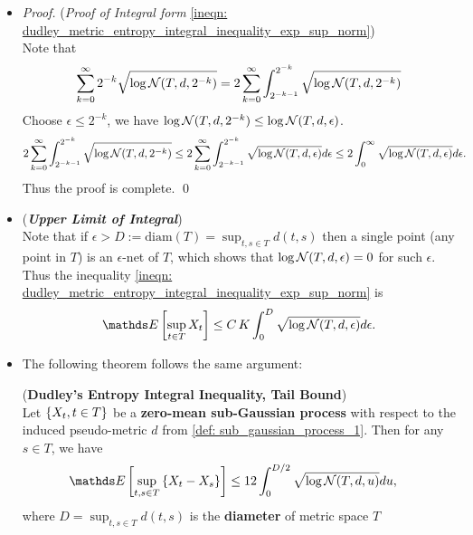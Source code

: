 \documentclass[11pt]{article}
\begin{document}
\begin{itemize}
\item \begin{proof} (\emph{Proof of Integral form} \eqref{ineqn: dudley_metric_entropy_integral_inequality_exp_sup_norm})\\
Note that 
\begin{align*}
\sum_{k=0}^{\infty} 2^{-k} \sqrt{\log {\mathcal N}(T, d, 2^{-k}) } = 2\sum_{k=0}^{\infty} \int_{2^{-k-1}}^{2^{-k}} \sqrt{\log {\mathcal N}(T, d, 2^{-k}) }
\end{align*} Choose $\epsilon \le 2^{-k}$, we have $\log {\mathcal N}(T, d, 2^{-k}) \le \log {\mathcal N}(T, d, \epsilon)$.
\begin{align*}
2\sum_{k=0}^{\infty} \int_{2^{-k-1}}^{2^{-k}} \sqrt{\log {\mathcal N}(T, d, 2^{-k}) } &\le 2\sum_{k=0}^{\infty} \int_{2^{-k-1}}^{2^{-k}} \sqrt{\log {\mathcal N}(T, d, \epsilon) } d\epsilon \le  2 \int_{0}^{\infty}\sqrt{\log {\mathcal N}(T, d, \epsilon) } d\epsilon.
\end{align*} Thus the proof is complete. \qed
\end{proof}

\item \begin{remark} (\textbf{\emph{Upper Limit of Integral}})\\
Note that if $\epsilon > D := \text{diam}(T) = \sup_{t, s\in T}d(t, s)$ then a single point (any point in $T$) is an $\epsilon$-net of $T$, which shows that $\log {\mathcal N}(T, d, \epsilon) = 0$ for such $\epsilon$. Thus the inequality \eqref{ineqn: dudley_metric_entropy_integral_inequality_exp_sup_norm} is 
\begin{align*}
\E{}{\sup_{t\in T}X_t } \le C\,K\int_{0}^{D} \sqrt{\log \cN(T, d, \epsilon)} d\epsilon.
\end{align*}
\end{remark}

\item The following theorem follows the same argument:
\begin{theorem} (\textbf{Dudley's Entropy Integral Inequality, Tail Bound}) \citep{boucheron2013concentration}\\
Let $\left\{X_{t}, t \in T\right\}$ be a \textbf{zero-mean sub-Gaussian process}  with respect to the induced pseudo-metric $d$ from \eqref{def: sub_gaussian_process_1}. Then for any $s \in T$,  we have
\begin{align}
\E{}{\sup_{t, s \in T}\set{X_t - X_{s}}} &\le  12 \int_{0}^{D/2}\sqrt{\log \cN(T, d, u)} du, \label{ineqn: dudley_metric_entropy_integral_inequality_tail_difference}
\end{align} where $D  = \sup_{t, s\in T}d(t, s)$ is the \textbf{diameter} of metric space $T$
\end{theorem}


\end{itemize}
\end{document}
